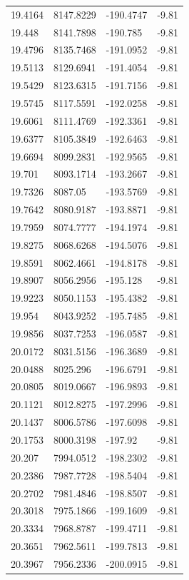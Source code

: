 \begin{table}[H]
\begin{tabular}{llll}
19.4164 & 8147.8229 & -190.4747 & -9.81 \\
19.448 & 8141.7898 & -190.785 & -9.81 \\
19.4796 & 8135.7468 & -191.0952 & -9.81 \\
19.5113 & 8129.6941 & -191.4054 & -9.81 \\
19.5429 & 8123.6315 & -191.7156 & -9.81 \\
19.5745 & 8117.5591 & -192.0258 & -9.81 \\
19.6061 & 8111.4769 & -192.3361 & -9.81 \\
19.6377 & 8105.3849 & -192.6463 & -9.81 \\
19.6694 & 8099.2831 & -192.9565 & -9.81 \\
19.701 & 8093.1714 & -193.2667 & -9.81 \\
19.7326 & 8087.05 & -193.5769 & -9.81 \\
19.7642 & 8080.9187 & -193.8871 & -9.81 \\
19.7959 & 8074.7777 & -194.1974 & -9.81 \\
19.8275 & 8068.6268 & -194.5076 & -9.81 \\
19.8591 & 8062.4661 & -194.8178 & -9.81 \\
19.8907 & 8056.2956 & -195.128 & -9.81 \\
19.9223 & 8050.1153 & -195.4382 & -9.81 \\
19.954 & 8043.9252 & -195.7485 & -9.81 \\
19.9856 & 8037.7253 & -196.0587 & -9.81 \\
20.0172 & 8031.5156 & -196.3689 & -9.81 \\
20.0488 & 8025.296 & -196.6791 & -9.81 \\
20.0805 & 8019.0667 & -196.9893 & -9.81 \\
20.1121 & 8012.8275 & -197.2996 & -9.81 \\
20.1437 & 8006.5786 & -197.6098 & -9.81 \\
20.1753 & 8000.3198 & -197.92 & -9.81 \\
20.207 & 7994.0512 & -198.2302 & -9.81 \\
20.2386 & 7987.7728 & -198.5404 & -9.81 \\
20.2702 & 7981.4846 & -198.8507 & -9.81 \\
20.3018 & 7975.1866 & -199.1609 & -9.81 \\
20.3334 & 7968.8787 & -199.4711 & -9.81 \\
20.3651 & 7962.5611 & -199.7813 & -9.81 \\
20.3967 & 7956.2336 & -200.0915 & -9.81 \\

\end{tabular}
\end{table}
